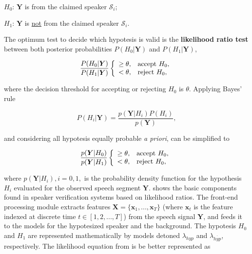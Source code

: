 \begin{description}\itemsep0pt
    \item $H_0$: $\boldsymbol{Y}$ is from the claimed speaker $\mathcal{S}_i$;
    \item $H_1$: $\boldsymbol{Y}$ is \underline{not} from the claimed speaker $\mathcal{S}_i$.
\end{description}

\noindent The optimum test to decide which hypotesis is valid is the \textbf{likelihood ratio test} between both posterior probabilities $P(H_0|\boldsymbol{Y})$ and $P(H_1|\boldsymbol{Y})$,

\begin{equation}
    \frac{P(H_0|\boldsymbol{Y})}{P(H_1|\boldsymbol{Y})} \verifytestB{\theta}{H_0}
    \label{eq:likelihood-ratio-test}
\end{equation}

\noindent where the decision threshold for accepting or rejecting $H_0$ is $\theta$. Applying Bayes' rule

\begin{equation}
    P(H_i|\boldsymbol{Y}) = \frac{p(\boldsymbol{Y}|H_i)P(H_i)}{p(\boldsymbol{Y})},
    \label{eq:bayes-for-hypotesis}
\end{equation}

\noindent and considering all hypotesis equally probable \textit{a priori},  can be simplified to

\begin{equation}
    \frac{p(\boldsymbol{Y}|H_0)}{p(\boldsymbol{Y}|H_1)} \verifytestB{\theta}{H_0}
    \label{eq:likelihood-ratio-test-2}
\end{equation}

\noindent where $p(\boldsymbol{Y}|H_i), i = 0, 1,$ is the probability density function for the hypothesis $H_i$ evaluated for the observed speech segment $\boldsymbol{Y}$.  shows the basic components found in speaker verification systems based on likelihood ratios. The front-end processing module extracts features $\boldsymbol{X} = \{\boldsymbol{x}_1, ..., \boldsymbol{x}_T\}$ (where $\boldsymbol{x}_t$ is the feature indexed at discrete time $t \in [1, 2, ..., T]$) from the speech signal $\boldsymbol{Y}$, and feeds it to the models for the hypotesized speaker and the background. The hypotesis $H_0$ and $H_1$ are represented mathematically by models detoned $\lambda_{hyp}$ and $\lambda_{\overline{hyp}}$, respectively. The likelihood equation from  is be better represented as


